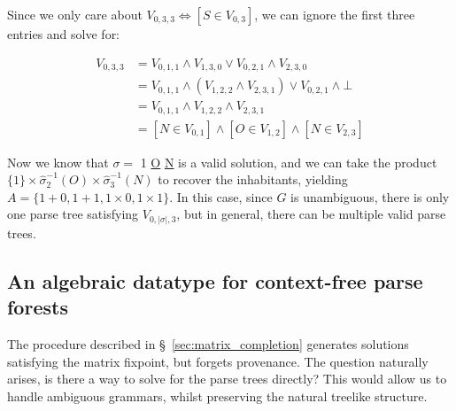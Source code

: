 \documentclass[sigplan,review,acmsmall,nonacm,anonymous]{acmart}\settopmatter{printfolios=false,printccs=false,printacmref=false}
\begin{document}
  \noindent Since we only care about $V_{0, 3, 3} \Leftrightarrow [S \in V_{0, 3}]$, we can ignore the first three entries and solve for:

  \begin{align*}
    V_{0, 3, 3} &= V_{0, 1, 1} \land V_{1, 3, 0} \lor V_{0, 2, 1} \land V_{2, 3, 0}\\
    &= V_{0, 1, 1} \land (V_{1, 2, 2} \land V_{2, 3, 1}) \lor V_{0, 2, 1} \land \bot\\
    &= V_{0, 1, 1} \land V_{1, 2, 2} \land V_{2, 3, 1}\\
    &= [N \in V_{0, 1}] \land [O \in V_{1, 2}] \land [N \in V_{2, 3}]
  \end{align*}

  Now we know that $\sigma =$ 1 \underline{O} \underline{N} is a valid solution, and we can take the product $\{1\}\times \hat\sigma_2^{-1}(O) \times \hat\sigma_3^{-1}(N)$ to recover the inhabitants, yielding $A=\{1+0, 1+1, 1\times 0, 1\times 1\}$. In this case, since $G$ is unambiguous, there is only one parse tree satisfying $V_{0, |\sigma|, 3}$, but in general, there can be multiple valid parse trees.

  \subsection{An algebraic datatype for context-free parse forests}\label{sec:ptree}

  The procedure described in \S~\ref{sec:matrix_completion} generates solutions satisfying the matrix fixpoint, but forgets provenance. The question naturally arises, is there a way to solve for the parse trees directly? This would allow us to handle ambiguous grammars, whilst preserving the natural treelike structure.
\end{document}
